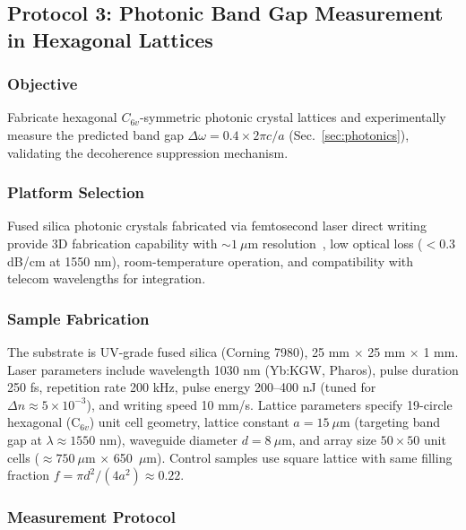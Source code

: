 
\subsection{Protocol 3: Photonic Band Gap Measurement in Hexagonal Lattices}

\subsubsection{Objective}

Fabricate hexagonal $C_{6v}$-symmetric photonic crystal lattices and experimentally measure the predicted band gap $\Delta\omega = 0.4 \times 2\pi c/a$ (Sec.~\ref{sec:photonics}), validating the decoherence suppression mechanism.

\subsubsection{Platform Selection}

Fused silica photonic crystals fabricated via femtosecond laser direct writing provide 3D fabrication capability with $\sim 1~\mu$m resolution~\cite{Szameit2010}, low optical loss ($< 0.3$ dB/cm at 1550 nm), room-temperature operation, and compatibility with telecom wavelengths for integration.

\subsubsection{Sample Fabrication}

The substrate is UV-grade fused silica (Corning 7980), 25 mm $\times$ 25 mm $\times$ 1 mm. Laser parameters include wavelength 1030 nm (Yb:KGW, Pharos), pulse duration 250 fs, repetition rate 200 kHz, pulse energy 200--400 nJ (tuned for $\Delta n \approx 5 \times 10^{-3}$), and writing speed 10 mm/s. Lattice parameters specify 19-circle hexagonal (C$_{6v}$) unit cell geometry, lattice constant $a = 15~\mu$m (targeting band gap at $\lambda \approx 1550$ nm), waveguide diameter $d = 8~\mu$m, and array size $50 \times 50$ unit cells ($\approx 750~\mu$m $\times$ 650~$\mu$m). Control samples use square lattice with same filling fraction $f = \pi d^2 / (4a^2) \approx 0.22$.

\subsubsection{Measurement Protocol}

